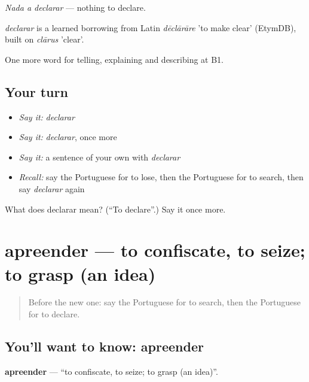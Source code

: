 \emph{Nada a declarar} — nothing to declare.

\begin{cousinweb}
\emph{declarar} is a learned borrowing from Latin \emph{dēclārāre} 'to make clear' (EtymDB), built on \emph{clārus} 'clear'.
\end{cousinweb}

\begin{grammarlens}[title={What you've built}]
One more word for telling, explaining and describing at B1.
\end{grammarlens}

\subsection*{Your turn}
\begin{itemize}
\raggedright
  \item \emph{Say it:} \emph{declarar}
  \item \emph{Say it:} \emph{declarar}, once more
  \item \emph{Say it:} a sentence of your own with \emph{declarar}
  \item \emph{Recall:} say the Portuguese for to lose, then the Portuguese for to search, then say \emph{declarar} again
\end{itemize}

\begin{tcolorbox}[breakable,colback=teal!4,colframe=teal!35!black,title={Before you move on}]
What does declarar mean? (\textquotedblleft{}To declare\textquotedblright{}.) Say it once more.
\end{tcolorbox}
\section[apreender]{apreender — to confiscate, to seize; to grasp (an idea)}

\label{lesson:PT-C423-apreender}



\begin{quote}
Before the new one: say the Portuguese for to search, then the Portuguese for to declare.
\end{quote}

\subsection*{You'll want to know: apreender}
\textbf{apreender} — \textquotedblleft{}to confiscate, to seize; to grasp (an idea)\textquotedblright{}.

